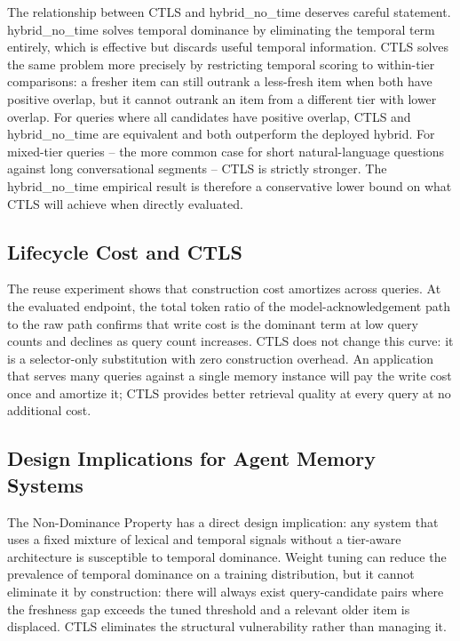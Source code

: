 The relationship between CTLS and hybrid\_no\_time deserves careful statement. hybrid\_no\_time solves temporal dominance by eliminating the temporal term entirely, which is effective but discards useful temporal information. CTLS solves the same problem more precisely by restricting temporal scoring to within-tier comparisons: a fresher item can still outrank a less-fresh item when both have positive overlap, but it cannot outrank an item from a different tier with lower overlap. For queries where all candidates have positive overlap, CTLS and hybrid\_no\_time are equivalent and both outperform the deployed hybrid. For mixed-tier queries -- the more common case for short natural-language questions against long conversational segments -- CTLS is strictly stronger. The hybrid\_no\_time empirical result is therefore a conservative lower bound on what CTLS will achieve when directly evaluated.

\subsection{Lifecycle Cost and CTLS}

The reuse experiment shows that construction cost amortizes across queries. At the evaluated endpoint, the total token ratio of the model-acknowledgement path to the raw path confirms that write cost is the dominant term at low query counts and declines as query count increases. CTLS does not change this curve: it is a selector-only substitution with zero construction overhead. An application that serves many queries against a single memory instance will pay the write cost once and amortize it; CTLS provides better retrieval quality at every query at no additional cost.

\subsection{Design Implications for Agent Memory Systems}

\label{sec:disc_design}

The Non-Dominance Property has a direct design implication: any system that uses a fixed mixture of lexical and temporal signals without a tier-aware architecture is susceptible to temporal dominance. Weight tuning can reduce the prevalence of temporal dominance on a training distribution, but it cannot eliminate it by construction: there will always exist query-candidate pairs where the freshness gap exceeds the tuned threshold and a relevant older item is displaced. CTLS eliminates the structural vulnerability rather than managing it.


